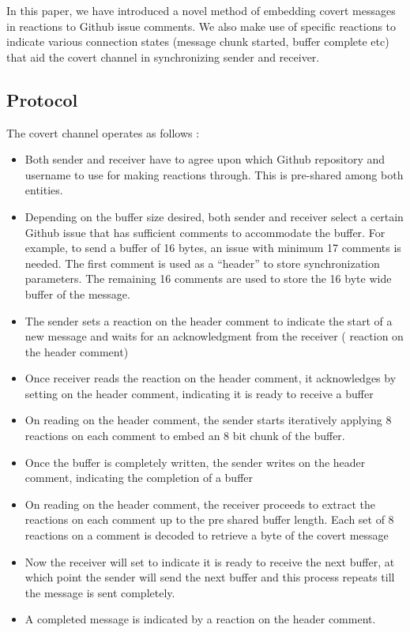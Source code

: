 \documentclass[conference]{IEEEtran}
\begin{document}
In this paper, we have introduced a novel method of embedding covert messages in reactions to Github issue comments. We also make use of specific reactions to indicate various connection states (message chunk started, buffer complete etc) that aid the covert channel in synchronizing sender and receiver. 

\subsection{Protocol}\label{AA}
The covert channel operates as follows : 
\begin{itemize}
\item Both sender and receiver have to agree upon which Github repository and username to use for making reactions through. This is pre-shared among both entities.
\item Depending on the buffer size desired, both sender and receiver select a certain Github issue that has sufficient comments to accommodate the buffer. For example, to send a buffer of 16 bytes, an issue with minimum 17 comments is needed. The first comment is used as a “header” to store synchronization parameters. The remaining 16 comments are used to store the 16 byte wide buffer of the message.
\item The sender sets a  reaction on the header comment to indicate the start of a new message and waits for an acknowledgment from the receiver ( reaction on the header comment)
\item Once receiver reads the  reaction on the header comment, it acknowledges by setting  on the header comment, indicating it is ready to receive a buffer
\item On reading  on the header comment, the sender starts iteratively applying 8 reactions on each comment to embed an 8 bit chunk of the buffer.
\item Once the buffer is completely written, the sender writes  on the header comment, indicating the completion of a buffer
\item On reading  on the header comment, the receiver proceeds to extract the reactions on each comment up to the pre shared buffer length. Each set of 8 reactions on a comment is decoded to retrieve a byte of the covert message
\item Now the receiver will set  to indicate it is ready to receive the next buffer, at which point the sender will send the next buffer and this process repeats till the message is sent completely.
\item A completed message is indicated by a  reaction on the header comment.
\end{itemize}
\end{document}
